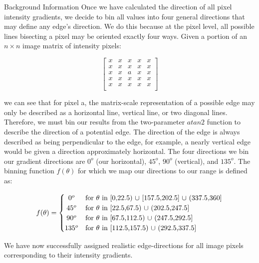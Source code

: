 \documentclass[a4paper,12pt]{article}
\begin{document}
\begin{section}{Background Information}
Once we have calculated the direction of all pixel intensity gradients, we decide to bin all values into four general directions that may define any edge's direction.
We do this because at the pixel level, all possible lines bisecting a pixel may be oriented exactly four ways.
Given a portion of an $n\times n$ image matrix of intensity pixels:

\singlespacing
\begin{center}
\[
\begin{bmatrix}
x & x & x & x & x\\
x & x & x & x & x\\
x & x & a & x & x\\
x & x & x & x & x\\
x & x & x & x & x\\	
\end{bmatrix}
\]
\end{center}
\doublespacing

we can see that for pixel a, the matrix-scale representation of a possible edge may only be described as a horizontal line, vertical line, or two diagonal lines.
Therefore, we must bin our results from the two-parameter $atan2$ function to describe the direction of a potential edge.
The direction of the edge is always described as being perpendicular to the edge, for example, a nearly vertical edge would be given a direction approximately horizontal.
The four directions we bin our gradient directions are $0^o$ (our horizontal), $45^o$, $90^o$ (vertical), and $135^o$.
The binning function $f(\theta)$ for which we map our directions to our range is defined as:

\singlespacing
\begin{center}
\[
f(\theta) = \left\{\def\arraystretch{1.2}%
  \begin{array}{@{}c@{\quad}l@{}}
	0^o & \text{for $\theta$ in [0,22.5) $\cup$ [157.5,202.5] $\cup$ (337.5,360]}\\
	45^o & \text{for $\theta$ in [22.5,67.5) $\cup$ (202.5,247.5]}\\
	90^o & \text{for $\theta$ in [67.5,112.5) $\cup$ (247.5,292.5]}\\
	135^o & \text{for $\theta$ in [112.5,157.5) $\cup$ (292.5,337.5]}\\
  \end{array}\right.
\]
\end{center} 
\doublespacing

We have now successfully assigned realistic edge-directions for all image pixels corresponding to their intensity gradients.


\end{section}
\end{document}

